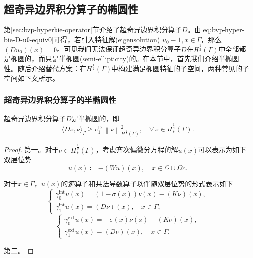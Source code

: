 \subsection{超奇异边界积分算子的椭圆性}
\label{sec:bvp-bie-hyper-ellipticity}

第\ref{sec:bvp-hyperbie-operator}节介绍了超奇异边界积分算子$D$。由\eqref{eq:bvp-hyper-bie-D-u0-equiv0}可得，若引入特征解(eigensolution) $u_{0} \equiv 1, x \in \Gamma$，那么$\left( D u_{0}  \right) (x) = 0$。可见我们无法保证超奇异边界积分算子$D$在$H^{\frac{1}{2}}(\Gamma)$中全部都是椭圆的，而只是半椭圆(semi-ellipticity)的。在本节中，首先我们介绍半椭圆性。随后介绍替代方案：在$H^{\frac{1}{2}}(\Gamma)$中构建满足椭圆特征的子空间，两种常见的子空间如下文所示。

\subsubsection{超奇异边界积分算子的半椭圆性}
\label{sec:bvp-bie-hyper-semi-ellipticity}

\begin{theorem}[超奇异边界积分算子的半椭圆性]
  超奇异边界积分算子$D$是半椭圆的，即
  \begin{equation*}
    \langle D \nu, \nu \rangle_{\Gamma} \ge c_{1}^{\text{D}} \,
    \left\| \nu \right\|_{H^{\frac{1}{2}}(\Gamma)}^{2}, \quad \forall \, \nu \in H_{*}^{\frac{1}{2}}(\Gamma).
  \end{equation*}
\end{theorem}
\begin{proof}
  第一。对于$\nu \in H_{*}^{\frac{1}{2}}(\Gamma)$，考虑齐次偏微分方程的解$u(x)$可以表示为如下双层位势
  \begin{equation*}
    u(x) \coloneqq - \left( W u \right)(x) , \quad x \in \Omega \cup \Omega{c}.
  \end{equation*}

  对于$x \in \Gamma$，$u(x)$的迹算子和共法导数算子以伴随双层位势的形式表示如下
  \begin{equation*}
    \begin{cases}
      \gamma_{0}^{\text{int}} u(x) = \left( 1 - \sigma(x) \right)
      \nu(x) - \left( K \nu \right)(x), \\
      \gamma_{1}^{\text{int}} u(x) = \left( D \nu \right) (x), \quad x \in \Gamma,
    \end{cases}
  \end{equation*}
  \begin{equation*}
    \begin{cases}
      \gamma_{0}^{\text{ext}} u(x) = - \sigma(x)
      \nu(x) - \left( K \nu \right)(x), \\
      \gamma_{1}^{\text{ext}} u(x) = \left( D \nu \right) (x), \quad x \in \Gamma.
    \end{cases}
  \end{equation*}

第二。








\end{proof}
